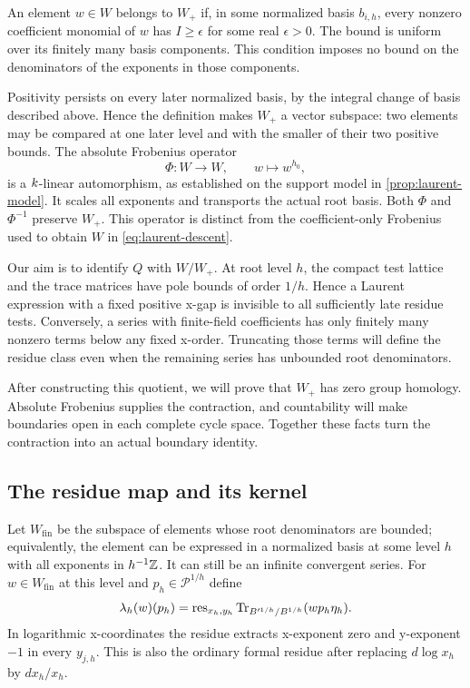 \begin{definition}
An element $w\in W$ belongs to $W_+$ if, in some normalized basis
$b_{i,h}$, every nonzero coefficient monomial of $w$ has
$I\geq\epsilon$ for some real $\epsilon>0$.  The bound is uniform
over its finitely many basis components.  This condition imposes no
bound on the denominators of the exponents in those components.
\end{definition}

Positivity persists on every later normalized basis, by the integral
change of basis described above.  Hence the definition makes $W_+$ a
vector subspace: two elements may be compared at one later level and
with the smaller of their two positive bounds.  The absolute
Frobenius operator
\[
 \Phi:W\longrightarrow W,\qquad w\longmapsto w^{h_0},
\]
is a $k$-linear automorphism, as established on the support model
in \cref{prop:laurent-model}.  It scales all exponents and transports
the actual root basis.  Both $\Phi$ and $\Phi^{-1}$ preserve $W_+$.
This operator is distinct from the coefficient-only Frobenius used
to obtain $W$ in \cref{eq:laurent-descent}.

Our aim is to identify $Q$ with $W/W_+$. At root level $h$, the
compact test lattice and the trace matrices have pole bounds of order
$1/h$. Hence a Laurent expression with a fixed positive x-gap is
invisible to all sufficiently late residue tests. Conversely, a series
with finite-field coefficients has only finitely many nonzero terms
below any fixed x-order. Truncating those terms will define the residue
class even when the remaining series has unbounded root denominators.

After constructing this quotient, we will prove that $W_+$ has zero
group homology. Absolute Frobenius supplies the contraction, and
countability will make boundaries open in each complete cycle space.
Together these facts turn the contraction into an actual boundary
identity.

\subsection{The residue map and its kernel}

Let $W_{\mathrm{fin}}$ be the subspace of elements whose root
denominators are bounded; equivalently, the element can be expressed
in a normalized basis at some level $h$ with all exponents in
$h^{-1}\mathbb Z$.  It can still be an infinite convergent series.  For
$w\in W_{\mathrm{fin}}$ at this level and
$p_h\in\mathcal P^{1/h}$ define
\begin{equation}
 \lambda_h(w)(p_h)=
 \operatorname{res}_{x_h,y_h}
 \operatorname{Tr}_{B'^{1/h}/B^{1/h}}(w p_h\eta_h).
 \label{eq:cutoff-residue-pairing}
\end{equation}
In logarithmic x-coordinates the residue extracts x-exponent zero and
y-exponent $-1$ in every $y_{j,h}$.  This is also the ordinary formal
residue after replacing $d\log x_h$ by $dx_h/x_h$.

